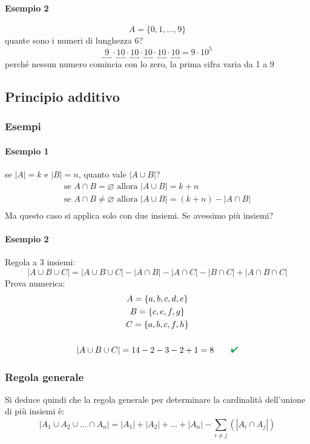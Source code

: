 \documentclass[italian]{article}
\renewcommand{\checkmark}{\textcolor{ForestGreen}{\text{$\qquad$\ding{52}}}}
\begin{document}
\paragraph{Esempio 2}
\[
	A = \{ 0,1,...,9 \}
\]
quante sono i numeri di lunghezza 6?
\[
	\underbracket{\;9\;} \cdot \underbracket{10}\cdot \underbracket{10}\cdot \underbracket{10}\cdot \underbracket{10}\cdot \underbracket{10} = 9\cdot 10^5
\]
perché nessun numero comincia con lo zero, la prima cifra varia da 1 a 9

\subsection{Principio additivo}
\subsubsection{Esempi}
\paragraph{Esempio 1}
se $|A| = k$ e $|B| = n$, quanto vale $|A\cup B|$?
\begin{gather*}
	\text{se } A \cap B = \varnothing \text{ allora } |A\cup B| = k + n \\
	\text{se } A \cap B \neq \varnothing \text{ allora } |A\cup B| = (k + n) - |A \cap B| \\
\end{gather*}
Ma questo caso si applica solo con due insiemi. Se avessimo più insiemi?
\paragraph{Esempio 2}
Regola a 3 insiemi:
\[
	|A\cup B \cup C| = |A \cup B \cup C| - |A \cap B| - |A \cap C| - |B \cap C| + |A \cap B \cap C|
\]
Prova numerica:
\begin{gather*}
	A = \{ a,b,c,d,e \} \\
	B = \{ c,e,f,g \} \\
	C = \{ a,b,c,f,h \} \\\\
	|A\cup B \cup C| = 14 - 2 - 3 - 2 + 1 = 8 \checkmark
\end{gather*}
\subsubsection{Regola generale}
Si deduce quindi che la regola generale per determinare la cardinalità dell'unione di più insiemi è:
\[
	|A_1 \cup A_2 \cup ... \cap A_n| = |A_1| + |A_2| + ... + |A_n| - \sum_{i\neq j}^{}\left( |A_i \cap A_j| \right)
\]
\end{document}

